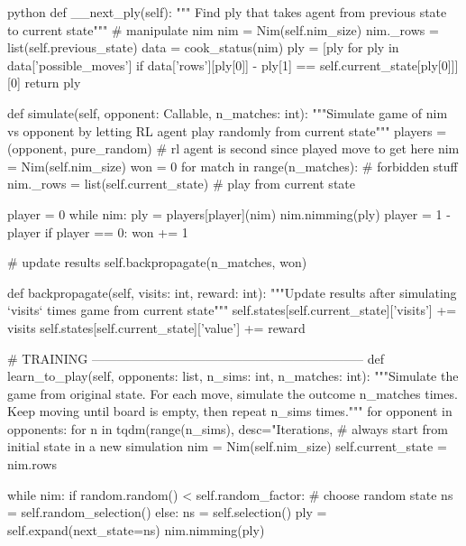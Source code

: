 \begin{mintedbox}{python}
        def __next_ply(self):
            """ Find ply that takes agent from previous state to current state"""
            # manipulate nim
            nim = Nim(self.nim_size)
            nim._rows = list(self.previous_state)
            data = cook_status(nim)
            ply = [ply for ply in data['possible_moves'] if data['rows'][ply[0]] - ply[1] == self.current_state[ply[0]]][0]
            return ply

        def simulate(self, opponent: Callable, n_matches: int):
            """Simulate game of nim vs opponent by letting RL agent play randomly from current state"""
            players = (opponent, pure_random)  # rl agent is second since played move to get here
            nim = Nim(self.nim_size)
            won = 0
            for match in range(n_matches):
                # forbidden stuff
                nim._rows = list(self.current_state)  # play from current state

                player = 0
                while nim:
                    ply = players[player](nim)
                    nim.nimming(ply)
                    player = 1 - player
                if player == 0:
                    won += 1

            # update results
            self.backpropagate(n_matches, won)

        def backpropagate(self, visits: int, reward: int):
            """Update results after simulating `visits` times game from current state"""
            self.states[self.current_state]['visits'] += visits
            self.states[self.current_state]['value'] += reward

        # TRAINING -----------------------------------------------------------------
        def learn_to_play(self, opponents: list, n_sims: int, n_matches: int):
            """Simulate the game from original state. For each move, simulate the outcome n_matches times.
            Keep moving until board is empty, then repeat n_sims times."""
            for opponent in opponents:
                for n in tqdm(range(n_sims), desc="Iterations, %
                    # always start from initial state in a new simulation
                    nim = Nim(self.nim_size)
                    self.current_state = nim.rows

                    while nim:
                        if random.random() < self.random_factor:
                            # choose random state
                            ns = self.random_selection()
                        else:
                            ns = self.selection()
                        ply = self.expand(next_state=ns)
                        nim.nimming(ply)


\end{mintedbox}
